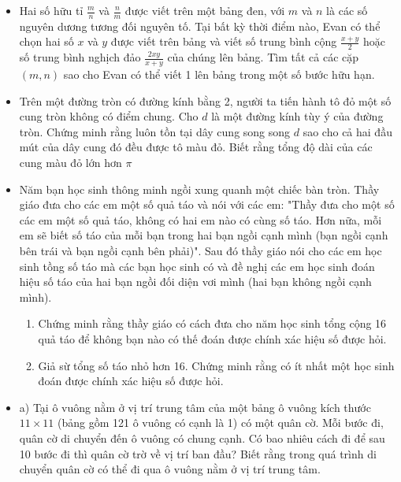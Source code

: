 \documentclass[11pt]{scrartcl}
\begin{document}
\begin{itemize}[label=, leftmargin=0em, itemsep=0.5em]
    \item \begin{btvn}
        Hai số hữu tỉ \(\tfrac{m}{n}\) và \(\tfrac{n}{m}\) được viết trên một bảng đen, với \(m\) và \(n\) là các số nguyên dương tương đối nguyên tố. Tại bất kỳ thời điểm nào, Evan có thể chọn hai số \(x\) và \(y\) được viết trên bảng và viết số trung bình cộng \(\tfrac{x+y}{2}\) hoặc số trung bình nghịch đảo \(\tfrac{2xy}{x+y}\) của chúng lên bảng. Tìm tất cả các cặp \((m,n)\) sao cho Evan có thể viết 1 lên bảng trong một số bước hữu hạn.
    \end{btvn}
    \item \begin{btvn}
        Trên một đường tròn có đường kính bằng 2, người ta tiến hành tô đỏ một số cung tròn không có điểm chung. Cho $d$ là một đường kính tùy ý của đường tròn. Chứng minh rằng luôn tồn tại dây cung song song $d$ sao cho cả hai đầu mút của dây cung đó đều được tô màu đỏ. Biết rằng tổng độ dài của các cung màu đỏ lớn hơn $\pi$
    \end{btvn}
    \item \begin{btvn}
        Năm bạn học sinh thông minh ngồi xung quanh một chiếc bàn tròn. Thầy giáo đưa cho các em một số quả táo và nói với các em: "Thầy đưa cho một số các em một số quả táo, không có hai em nào có cùng số táo. Hơn nữa, mỗi em sẽ biết số táo của mỗi bạn trong hai bạn ngồi cạnh mình (bạn ngồi cạnh bên trái và bạn ngồi cạnh bên phải)". Sau đó thầy giáo nói cho các em học sinh tồng số táo mà các bạn học sinh có và đề nghị các em học sinh đoán hiệu số táo của hai bạn ngồi đối diện vơi mình (hai bạn không ngồi cạnh mình).
        \begin{enumerate}[label=(\alph*)]
            \item Chứng minh rằng thầy giáo có cách đưa cho năm học sinh tổng cộng 16 quả táo để không bạn nào có thế đoán được chính xác hiệu số được hỏi.
            \item Giả sừ tổng số táo nhỏ hơn 16. Chứng minh rằng có ít nhất một học sinh đoán được chính xác hiệu số được hỏi.
        \end{enumerate}
    \end{btvn}
    \item \begin{btvn} a) Tại ô vuông nằm ở vị trí trung tâm của một bảng ô vuông kích thước $11 \times 11$ (bảng gồm 121 ô vuông có cạnh là 1) có một quân cờ. Mỗi bước đi, quân cờ di chuyển đến ô vuông có chung cạnh. Có bao nhiêu cách đi để sau 10 bước đi thì quân cờ trờ về vị trí ban đầu? Biết rằng trong quá trình di chuyển quân cờ có thể đi qua ô vuông nằm ở vị trí trung tâm.
    


\end{btvn}
\end{itemize}
\end{document}
